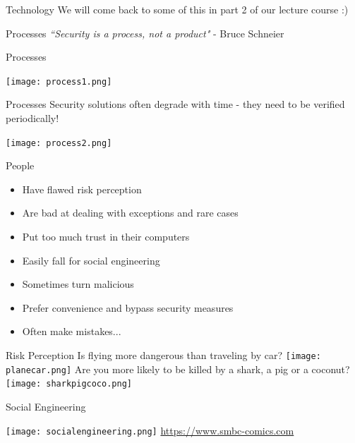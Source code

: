\documentclass[aspectratio=169]{beamer}
\begin{document}
\begin{frame}{Technology}
We will come back to some of this in part 2 of our lecture course :) 
\end{frame}

\begin{frame}{Processes}
\textit{``Security is a process, not a product"} - Bruce Schneier
\end{frame}

\begin{frame}{Processes}
\begin{center}
\texttt{[image: process1.png]} 
\end{center}
\end{frame}

\begin{frame}{Processes}
Security solutions often degrade with time - they need to be verified periodically!
\begin{center}
\texttt{[image: process2.png]} 
\end{center}
\end{frame}

\begin{frame}{People}
	\begin{itemize}
		\item Have flawed risk perception
		\item Are bad at dealing with exceptions and rare cases
        \item Put too much trust in their computers
        \item Easily fall for social engineering
        \item Sometimes turn malicious
        \item Prefer convenience and bypass security measures
        \item Often make mistakes...
	\end{itemize}
\end{frame}

\begin{frame}{Risk Perception}
Is flying more dangerous than traveling by car?
\newline
\texttt{[image: planecar.png]}
\newline 
Are you more likely to be killed by a shark, a pig or a coconut?
\newline
\texttt{[image: sharkpigcoco.png]}
\end{frame}

\begin{frame}{Social Engineering}
\begin{center}
\texttt{[image: socialengineering.png]}\newline
{\small \url{https://www.smbc-comics.com}}
\end{center}
\end{frame}
\end{document}
